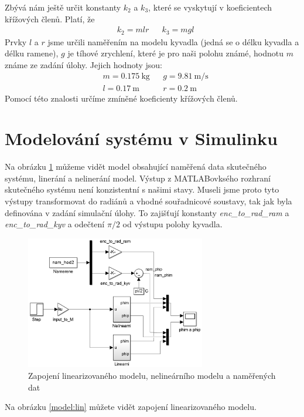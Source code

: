 \documentclass[11pt,a4paper]{article}
\begin{document}
Zbývá nám ještě určit konstanty $k_2$ a $k_3$, které se vyskytují v koeficientech křížových členů. Platí, že
\begin{align*}
&k_2 = mlr && k_3 = mgl
\end{align*}
Prvky $l$ a $r$ jsme určili naměřením na modelu kyvadla (jedná se o délku kyvadla a délku ramene), $g$ je tíhové zrychlení, které je pro naši polohu známé, hodnotu $m$ známe ze zadání úlohy. Jejich hodnoty jsou: 
\begin{align*}
&m = \SI{0,175}{ \kilo \gram} &&g = \SI{9,81}{\meter \per \second}	\\
&l = \SI{0,17}{\meter} &&r = \SI{0,2}{\meter}
\end{align*}
Pomocí této znalosti určíme zmíněné koeficienty křížových členů.


\section{Modelování systému v Simulinku}
Na obrázku \ref{model:celk} můžeme vidět model obsahující naměřená data skutečného systému, linerání a nelinerání model. Výstup z MATLABovksého rozhraní skutečného systému není konzistentní s našimi stavy. Museli jsme proto tyto výstupy transformovat do radiánů a vhodné souřadnicové soustavy, tak jak byla definována v zadání simulační úlohy. To zajišťují konstanty \textit{enc{\_}to{\_}rad{\_}ram} a \textit{enc{\_}to{\_}rad{\_}kyv} a odečtení $\pi/2$ od výstupu polohy kyvadla. 

\begin{figure}[H]
\centering
\includegraphics[width=0.7\textwidth]{schema_celku.jpg}
\caption{Zapojení linearizovaného modelu, nelineárního modelu a naměřených dat}
\label{model:celk}
\end{figure}

Na obrázku \ref{model:lin} můžete vidět zapojení linearizovaného modelu.
\end{document}

